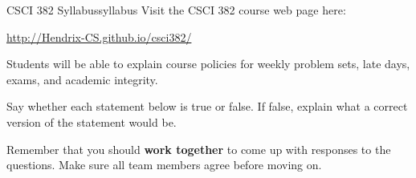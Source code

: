 \documentclass{tufte-handout}
\begin{document}
\newpage
\begin{model*}{CSCI 382 Syllabus}{syllabus}
  Visit the CSCI 382 course web page here: \bigskip

  \url{http://Hendrix-CS.github.io/csci382/}
\end{model*}

\begin{objective}
  Students will be able to explain course policies for weekly problem
  sets, late days, exams, and academic integrity.
\end{objective}

Say whether each statement below is true or false.  If false, explain
what a correct version of the statement would be.

Remember that you should \textbf{work together} to come up with
responses to the questions.  Make sure all team members agree before
moving on.
\end{document}
